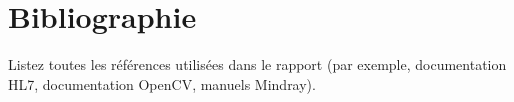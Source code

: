 \chapter*{Bibliographie}
Listez toutes les références utilisées dans le rapport (par exemple, documentation HL7, documentation OpenCV, manuels Mindray).
